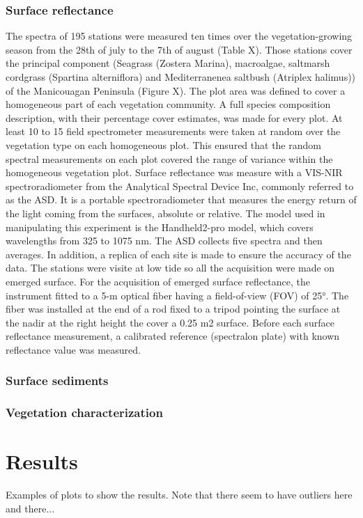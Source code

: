 \documentclass[essd, manuscript]{copernicus}
\begin{document}
\subsubsection{Surface reflectance}
The spectra of 195 stations were measured ten times over the vegetation-growing season from the 28th of july to the 7th of august (Table X). Those stations cover the principal component (Seagrass (Zostera Marina), macroalgae, saltmarsh cordgrass (Spartina alterniflora) and Mediterranenea saltbush (Atriplex halimus)) of the Manicouagan Peninsula (Figure X). The plot area was defined to cover a homogeneous part of each vegetation community. A full species composition description, with their percentage cover estimates, was made for every plot. At least 10 to 15 field spectrometer measurements were taken at random over the vegetation type on each homogeneous plot. This ensured that the random spectral measurements on each plot covered the range of variance within the homogeneous vegetation plot.
Surface reflectance was measure with a VIS-NIR spectroradiometer from the Analytical Spectral Device Inc, commonly referred to as the ASD. It is a portable spectroradiometer that measures the energy return of the light coming from the surfaces, absolute or relative. The model used in manipulating this experiment is the Handheld2-pro model, which covers wavelengths from 325 to 1075 nm. The ASD collects five spectra and then averages. In addition, a replica of each site is made to ensure the accuracy of the data. The stations were visite at low tide so all the acquisition were made on emerged surface. For the acquisition of emerged surface reflectance, the instrument fitted to a 5-m optical fiber having a field-of-view (FOV) of 25°. The fiber was installed at the end of a rod fixed to a tripod pointing the surface at the nadir at the right height the cover a 0.25 m2 surface. Before each surface reflectance measurement, a calibrated reference (spectralon plate) with known reflectance value was measured.

\subsubsection{Surface sediments}

\subsubsection{Vegetation characterization}

\section{Results}
Examples of plots to show the results. Note that there seem to have outliers here and there...
\end{document}
